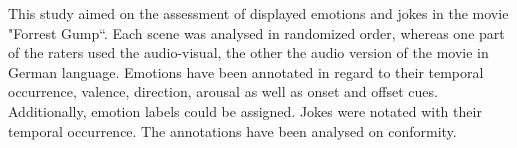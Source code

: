 This study aimed on the assessment of displayed emotions and jokes in the movie
"Forrest Gump“. Each scene was analysed in randomized order, whereas one part
of the raters used the audio-visual, the other the audio version of the movie
in German language. Emotions have been annotated in regard to their temporal
occurrence, valence, direction, arousal as well as onset and offset cues.
Additionally, emotion labels could be assigned. Jokes were notated with their
temporal occurrence. The annotations have been analysed on conformity.
